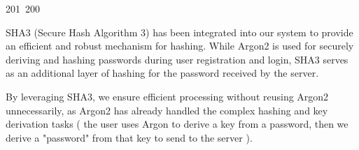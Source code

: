 201~200~\documentclass{article}
\begin{document}
	                                                                                                                                                                                                                                                                                                	                                                                                                                                        	    	                                                                                                	                                                                                                                                                                                                                                                                                                                                	                                                                        	                                                                        	                                                                                                                                        	                                                                        SHA3 (Secure Hash Algorithm 3) has been integrated into our system to provide an efficient and robust mechanism for hashing. While Argon2 is used for securely deriving and hashing passwords during user registration and login, SHA3 serves as an additional layer of hashing for the password received by the server. 

	                                                                                                                                                                                                                                                                                                	                                                                                                                                        	    	                                                                                                	                                                                                                                                                                                                                                                                                                                                	                                                                        	                                                                        	                                                                                                                                        	                                                                        By leveraging SHA3, we ensure efficient processing without reusing Argon2 unnecessarily, as Argon2 has already handled the complex hashing and key derivation tasks ( the user uses Argon to derive a key from a password, then we derive a "password" from that key to send to the server ).
\end{document}
